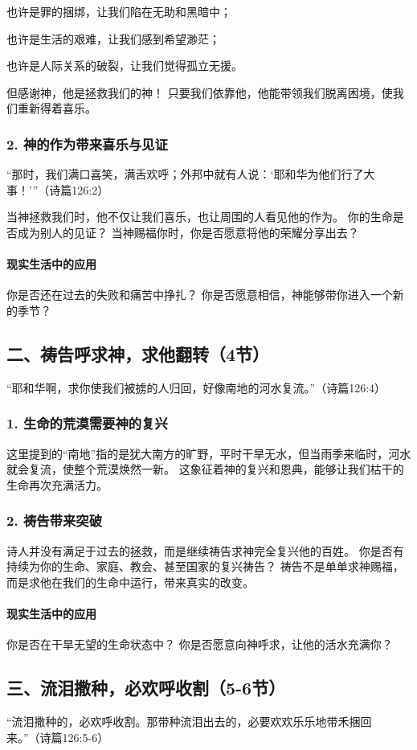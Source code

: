 \documentclass[a4paper, 12pt]{article}
\begin{document}
也许是罪的捆绑，让我们陷在无助和黑暗中；

也许是生活的艰难，让我们感到希望渺茫；

也许是人际关系的破裂，让我们觉得孤立无援。

但感谢神，他是拯救我们的神！ 只要我们依靠他，他能带领我们脱离困境，使我们重新得着喜乐。

\subsubsection*{2. 神的作为带来喜乐与见证}
“那时，我们满口喜笑，满舌欢呼；外邦中就有人说：‘耶和华为他们行了大事！’”（诗篇126:2）

当神拯救我们时，他不仅让我们喜乐，也让周围的人看见他的作为。
你的生命是否成为别人的见证？ 当神赐福你时，你是否愿意将他的荣耀分享出去？
\paragraph*{现实生活中的应用}

你是否还在过去的失败和痛苦中挣扎？
你是否愿意相信，神能够带你进入一个新的季节？
\subsection*{二、祷告呼求神，求他翻转（4节）}
“耶和华啊，求你使我们被掳的人归回，好像南地的河水复流。”（诗篇126:4）

\subsubsection*{1. 生命的荒漠需要神的复兴}
这里提到的“南地”指的是犹大南方的旷野，平时干旱无水，但当雨季来临时，河水就会复流，使整个荒漠焕然一新。
这象征着神的复兴和恩典，能够让我们枯干的生命再次充满活力。
\subsubsection*{2. 祷告带来突破}
诗人并没有满足于过去的拯救，而是继续祷告求神完全复兴他的百姓。
你是否有持续为你的生命、家庭、教会、甚至国家的复兴祷告？
祷告不是单单求神赐福，而是求他在我们的生命中运行，带来真实的改变。
\paragraph*{现实生活中的应用}

你是否在干旱无望的生命状态中？
你是否愿意向神呼求，让他的活水充满你？
\subsection*{三、流泪撒种，必欢呼收割（5-6节）}
“流泪撒种的，必欢呼收割。那带种流泪出去的，必要欢欢乐乐地带禾捆回来。”（诗篇126:5-6）
\end{document}
